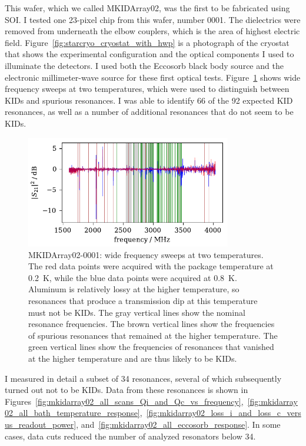 This wafer, which we called MKIDArray02, was the first to be fabricated using SOI.
I tested one 23-pixel chip from this wafer, number 0001.
The dielectrics were removed from underneath the elbow couplers, which is the area of highest electric field.
Figure~\ref{fig:starcryo_cryostat_with_hwp} is a photograph of the cryostat that shows the experimental configuration and the optical components I used to illuminate the detectors.
I used both the Eccosorb black body source and the electronic millimeter-wave source for these first optical tests.
Figure~\ref{fig:mkidarray02_wide_sweep_180_mK_real_and_fake} shows wide frequency sweeps at two temperatures, which were used to distinguish between KIDs and spurious resonances.
I was able to identify 66 of the 92 expected KID resonances, as well as a number of additional resonances that do not seem to be KIDs.

\begin{figure}[htb]
\centering
\includegraphics[width=0.8\textwidth]{multichroic/mkidarray02_wide_sweep_180_mK_real_and_fake.pdf}
\caption[MKIDArray02-0001: wide frequency sweeps at two temperatures.]
{
MKIDArray02-0001: wide frequency sweeps at two temperatures.
The red data points were acquired with the package temperature at \SI{0.2}{K}, while the blue data points were acquired at \SI{0.8}{K}.
Aluminum is relatively lossy at the higher temperature, so resonances that produce a transmission dip at this temperature must not be KIDs.
The gray vertical lines show the nominal resonance frequencies.
The brown vertical lines show the frequencies of spurious resonances that remained at the higher temperature.
The green vertical lines show the frequencies of resonances that vanished at the higher temperature and are thus likely to be KIDs.
}
\label{fig:mkidarray02_wide_sweep_180_mK_real_and_fake}
\end{figure}

I measured in detail a subset of 34 resonances, several of which subsequently turned out not to be KIDs.
Data from these resonances is shown in Figures~\ref{fig:mkidarray02_all_scans_Qi_and_Qc_vs_frequency},~\ref{fig:mkidarray02_all_bath_temperature_response},~\ref{fig:mkidarray02_loss_i_and_loss_c_versus_readout_power}, and~\ref{fig:mkidarray02_all_eccosorb_response}.
In some cases, data cuts reduced the number of analyzed resonators below 34.

